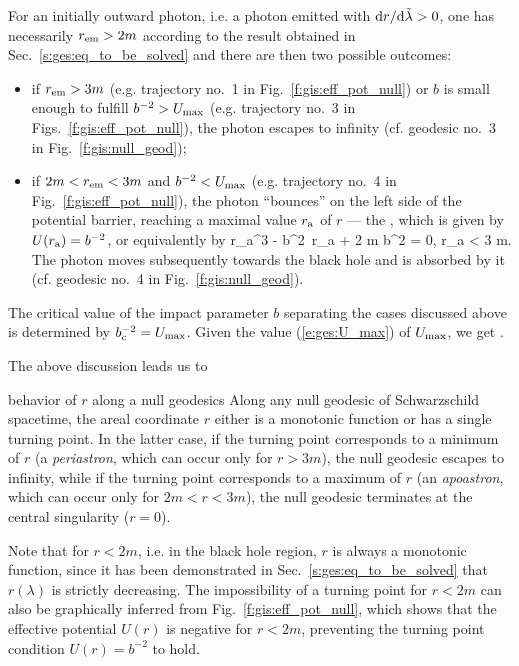 For an initially outward photon, i.e. a photon emitted with ${\mathrm{d} r}/{\mathrm{d}\tilde{\lambda}} > 0$,
one has necessarily $r_{\rm em}>2m$ according to the result obtained in Sec.~\ref{s:ges:eq_to_be_solved}
and there are then two possible outcomes:

\begin{itemize}
\item if $r_{\rm em} > 3 m$ (e.g. trajectory
no.~1 in Fig.~\ref{f:gis:eff_pot_null}) or
$b$ is small enough to fulfill $b^{-2} > U_{\rm max}$ (e.g. trajectory
no.~3 in Figs.~\ref{f:gis:eff_pot_null}), the photon escapes to infinity
(cf. geodesic no.~3 in Fig.~\ref{f:gis:null_geod});
\item if $2m < r_{\rm em} < 3 m$ and $b^{-2} < U_{\rm max}$ (e.g. trajectory
no.~4 in Fig.~\ref{f:gis:eff_pot_null}), the photon ``bounces'' on the left
side of the potential barrier, reaching a maximal value $r_{\rm a}$ of $r$
--- the ,
which is given by  $U(r_{\rm a}) = b^{-2}$, or equivalently by
\be \label{e:ges:r_apo_null}
   r_{\rm a}^3 - b^2\, r_{\rm a} + 2 m b^2 = 0, \quad r_{\rm a} < 3 m.
\ee
The photon moves subsequently towards the black hole and
is absorbed by it (cf. geodesic no.~4 in Fig.~\ref{f:gis:null_geod}).
\end{itemize}

The critical value of the impact parameter $b$ separating the cases discussed
above is determined by $b_{\rm c}^{-2} = U_{\rm max}$.
Given the value (\ref{e:ges:U_max}) of $U_{\rm max}$, we get
\be \label{e:ges:b_crit}
    .
\ee

The above discussion leads us to
\begin{tprop}{behavior of $r$ along a null geodesics}{}
Along any null geodesic of Schwarzschild spacetime, the areal coordinate $r$
either is a monotonic function or has a single turning point. In the latter case,
if the turning point corresponds to a minimum of $r$ (a \emph{periastron}, which can occur
only for $r>3m$), the null geodesic escapes to infinity, while if the turning
point corresponds to a maximum of $r$ (an \emph{apoastron}, which can occur only for $2m<r<3m$), the
null geodesic terminates at the central singularity ($r=0$).
\end{tprop}
Note that for $r<2m$, i.e. in the black hole region, $r$
is always a monotonic function, since it has been demonstrated in
Sec.~\ref{s:ges:eq_to_be_solved} that $r(\lambda)$ is strictly
decreasing. The impossibility of a turning point for $r<2m$ can also be
graphically inferred from Fig.~\ref{f:gis:eff_pot_null}, which shows
that the effective potential $U(r)$ is negative for $r<2m$,
preventing the turning point condition $U(r) = b^{-2}$ to hold.


